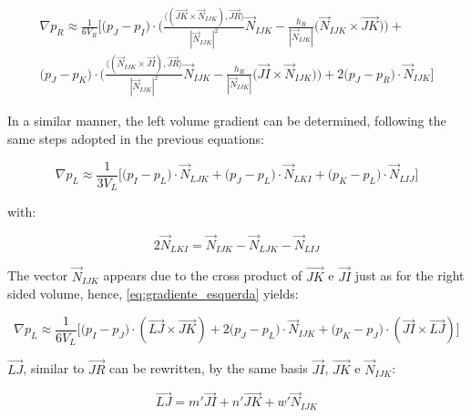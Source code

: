 \documentclass{article}
\begin{document}
\begin{equation} \label{eq:gradiente_direita_final}
\begin{split}
\nabla p_{R} \approx \frac{1}{6V_{R}} \Bigg[ \big( p_{J} - p_{I}\big) \cdot \Bigg( \frac{\langle(\vec{JK} \times \vec{N}_{IJK}), \vec{JR}\rangle}{|\vec{N}_{IJK}|^2}\vec{N}_{IJK} - \frac{h_{R}}{|\vec{N}_{IJK}|} \Big(\vec{N}_{IJK}\times \vec{JK} \Big) \Bigg) + \\
\big( p_{J} - p_{K} \big) \cdot \Bigg(\frac{\langle(\vec{N}_{IJK} \times \vec{JI}), \vec{JR}\rangle}{|\vec{N}_{IJK}|^2} \vec{N}_{IJK} - \frac{h_{R}}{|\vec{N}_{IJK}|}\Big( \vec{JI} \times \vec{N}_{IJK}\Big) \Bigg) + 2 \big(p_{J} - p_{R}\big) \cdot \vec{N}_{IJK} \Bigg]
\end{split}
\end{equation}

In a similar manner, the left volume gradient can be determined, following the same steps adopted in the previous equations:

\begin{equation} \label{eq:gradiente_esquerda}
\nabla p_{L} \approx \frac{1}{3V_{L}}\bigg[ \big( p_{I} - p_{L}\big) \cdot \vec{N}_{LJK} + 
\big( p_{J} - p_{L}\big) \cdot \vec{N}_{LKI} +
\big( p_{K} - p_{L}\big) \cdot \vec{N}_{LIJ} \bigg]
\end{equation}

with:

\begin{equation} \label{eq:N_LKI_vec}
2 \vec{N}_{LKI} = \vec{N}_{IJK} - \vec{N}_{LJK} - \vec{N}_{LIJ}
\end{equation}

The vector $\vec{N}_{IJK}$ appears due to the cross product of  $\vec{JK}$ e $\vec{JI}$ just as for the right sided volume, hence, \ref{eq:gradiente_esquerda} yields:

\begin{equation} \label{eq:gradiente_esquerda_vetores_N_IJK}
\nabla p_{L} \approx \frac{1}{6V_{L}}\bigg[ \big(p_{I} - p_{J}\big) \cdot (\vec{LJ} \times \vec{JK}) + 
2 \big( p_{J} - p_{L}\big) \cdot \vec{N}_{IJK} + \big( p_{K} -  p_{J}\big) \cdot (\vec{JI} \times \vec{LJ}) \bigg]
\end{equation}

$\vec{LJ}$, similar to $\vec{JR}$ can be rewritten, by the same basis $\vec{JI}$, $\vec{JK}$ e $\vec{N}_{IJK}$:

\begin{equation} \label{eq:vetor_LJ}
\vec{LJ} = m'\vec{JI} + n'\vec{JK} + w'\vec{N}_{IJK}
\end{equation}
\end{document}
